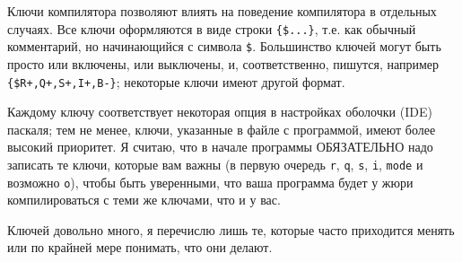 Ключи компилятора позволяют влиять на поведение компилятора в отдельных случаях. Все ключи 
оформляются в виде строки \verb|{$...}|, т.е. как обычный комментарий, но начинающийся с символа 
\verb|$|. Большинство ключей могут быть просто или включены, или выключены, и, соответственно, 
пишутся, например \verb|{$R+,Q+,S+,I+,B-}|; некоторые ключи имеют другой формат.

Каждому ключу соответствует некоторая опция в настройках оболочки (IDE) паскаля; тем не менее, 
ключи, указанные в файле с программой, имеют более высокий приоритет. Я считаю, что в начале программы ОБЯЗАТЕЛЬНО 
надо записать те ключи, которые вам важны (в первую очередь \verb|r|, \verb|q|, \verb|s|, \verb|i|, 
\verb|mode| и возможно \verb|o|), чтобы быть уверенными, что ваша программа  
будет у жюри компилироваться с теми же ключами, что и у вас.

Ключей довольно много, я перечислю лишь те, которые часто приходится менять или по крайней мере понимать, что они делают.

